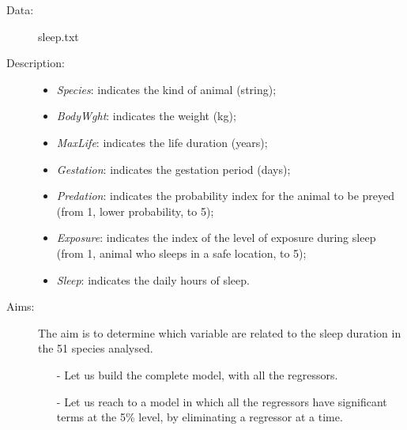 \begin{frame}
  \begin{description}
    \item[Data: ]sleep.txt \\
    \item[Description: ]
      \begin{footnotesize}
        \begin{itemize}
          \item \textit{Species}: indicates the kind of animal (string);
          \item \textit{BodyWght}: indicates the weight (kg);
          \item \textit{MaxLife}: indicates the life duration (years);
          \item \textit{Gestation}: indicates the gestation period (days);
          \item \textit{Predation}: indicates the probability index for the animal to be preyed (from 1, lower probability, to 5);
          \item \textit{Exposure}: indicates the index of the level of exposure during sleep (from 1, animal who sleeps in a safe location, to 5);
          \item \textit{Sleep}: indicates the daily hours of sleep.
        \end{itemize}
      \end{footnotesize}
    \item[Aims: ]
      \begin{footnotesize}
        The aim is to determine which variable are related to the sleep duration in the 51 species analysed.
        \begin{itemize}
          \item[-] Let us build the complete model, with all the regressors.
          \item[-] Let us reach to a model in which all the regressors have significant terms at the 5\% level, by eliminating a regressor at a time.
        \end{itemize}
      \end{footnotesize}
  \end{description}
\end{frame}

